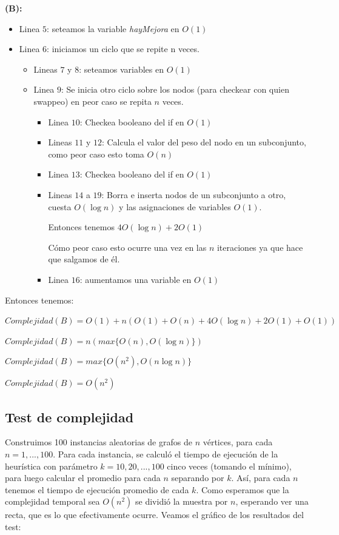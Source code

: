 \textbf{(B):}

\begin{itemize}
    \item Linea $5$: seteamos la variable \textit{hayMejora} en $O(1)$
    \item Linea $6$: iniciamos un ciclo que se repite n veces.
    \begin{itemize}
        \item Lineas $7$ y $8$: seteamos variables en $O(1)$
        \item Linea $9$: Se inicia otro ciclo sobre los nodos (para checkear con quien swappeo) en peor caso se repita $n$ veces.
        \begin{itemize}
            \item Linea $10$: Checkea booleano del if en $O(1)$
            \item Lineas $11$ y $12$: Calcula el valor del peso del nodo en un subconjunto, como peor caso esto toma $O(n)$
            \item Linea $13$: Checkea booleano del if en $O(1)$
            \item Lineas $14$ a $19$: Borra e inserta nodos de un subconjunto a otro, cuesta $O(\log n)$ y las asignaciones de variables $O(1)$. 

            Entonces tenemos $4O(\log n) + 2O(1)$

            Cómo peor caso esto ocurre una vez en las $n$ iteraciones ya que hace que salgamos de él.
            \item Linea $16$: aumentamos una variable en $O(1)$
        \end{itemize}
    \end{itemize}
\end{itemize}

Entonces tenemos:
\begin{center}
    $Complejidad(B) = O(1) + n(O(1)+O(n)+4O(\log n)+2O(1)+O(1))$

    $Complejidad(B) = n(max\{O(n),O(\log n)\})$

    $Complejidad(B) = max\{O(n^2),O(n\log n)\}$

    $Complejidad(B) = O(n^2)$
\end{center}

\subsection{Test de complejidad}

Construimos 100 instancias aleatorias de grafos de $n$ vértices, para cada $n = {1, ... , 100}$. Para cada instancia, se calculó el tiempo de ejecución de la heurística con parámetro $k = {10, 20, ..., 100}$ cinco veces (tomando el mínimo), para luego calcular el promedio para cada $n$ separando por $k$. Así, para cada $n$ tenemos el tiempo de ejecución promedio de cada $k$. Como esperamos que la complejidad temporal sea $O(n^2)$ se dividió la muestra por $n$, esperando ver una recta, que es lo que efectivamente ocurre. Veamos el gráfico de los resultados del test:

